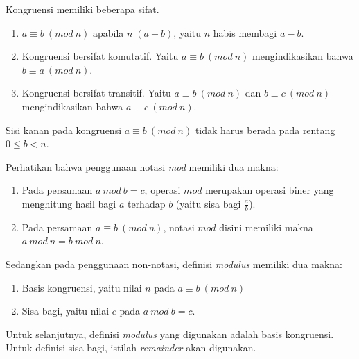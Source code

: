 Kongruensi memiliki beberapa sifat.\cite{stallings_cryptography}
\begin{enumerate}
\item $a\equiv b\ (mod\ n)$ apabila $n|(a - b)$, yaitu $n$ habis membagi $a-b$.
\item Kongruensi bersifat komutatif. Yaitu $a\equiv b\ (mod\ n)$ mengindikasikan bahwa $b\equiv a\ (mod\ n)$.
\item Kongruensi bersifat transitif. Yaitu $a\equiv b\ (mod\ n)$ dan $b\equiv c\ (mod\ n)$ mengindikasikan bahwa $a\equiv c\ (mod\ n)$.
\end{enumerate}
Sisi kanan pada kongruensi $a\equiv b\ (mod\ n)$ tidak harus berada pada rentang $0\le b<n$.

Perhatikan bahwa penggunaan notasi \textit{mod} memiliki dua makna:
\begin{enumerate}
\item Pada persamaan $a\ mod\ b = c$, operasi $mod$ merupakan operasi biner yang menghitung hasil bagi $a$ terhadap $b$ (yaitu sisa bagi $\frac{a}{b}$).
\item Pada persamaan $a\equiv b\ (mod\ n)$, notasi $mod$ disini memiliki makna $a\ mod\ n=b\ mod\ n$.
\end {enumerate}
Sedangkan pada penggunaan non-notasi, definisi \textit{modulus} memiliki dua makna:
\begin{enumerate}
\item Basis kongruensi, yaitu nilai $n$ pada $a\equiv b\ (mod\ n)$
\item Sisa bagi, yaitu nilai $c$ pada $a\ mod\ b=c$.
\end{enumerate}

Untuk selanjutnya, definisi \textit{modulus} yang digunakan adalah basis kongruensi. Untuk definisi sisa bagi, istilah \textit{remainder} akan digunakan.

